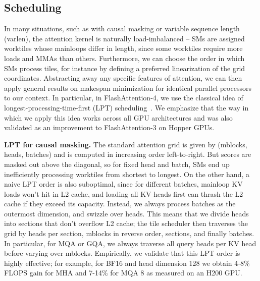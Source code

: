 \subsection{Scheduling}
\label{sec:algo_other}

In many situations, such as with causal masking or variable sequence length (varlen), the attention kernel is naturally load-imbalanced -- SMs are assigned worktiles whose mainloops differ in length, since some worktiles require more loads and MMAs than others. Furthermore, we can choose the order in which SMs process tiles, for instance by defining a preferred linearization of the grid coordinates. Abstracting away any specific features of attention, we can then apply general results on makespan minimization for identical parallel processors to our context. In particular, in FlashAttention-4, we use the classical idea of longest-processing-time-first (LPT) scheduling~\citep{graham1969}. We emphasize that the way in which we apply this idea works across all GPU architectures and was also validated as an improvement to FlashAttention-3 on Hopper GPUs.

\textbf{LPT for causal masking.} The standard attention grid is given by (mblocks, heads, batches) and is computed in increasing order left-to-right. But scores are masked out above the diagonal, so for fixed head and batch, SMs end up inefficiently processing worktiles from shortest to longest. On the other hand, a naive LPT order is also suboptimal, since for different batches, mainloop KV loads won't hit in L2 cache, and loading all KV heads first can thrash the L2 cache if they exceed its capacity. Instead, we always process batches as the outermost dimension, and swizzle over heads. This means that we divide heads into sections that don't overflow L2 cache; the tile scheduler then traverses the grid by heads per section, mblocks in reverse order, sections, and finally batches. In particular, for MQA or GQA, we always traverse all query heads per KV head before varying over mblocks. Empirically, we validate that this LPT order is highly effective; for example, for BF16 and head dimension 128 we obtain 4-8\% FLOPS gain for MHA and 7-14\% for MQA 8 as measured on an H200 GPU.

